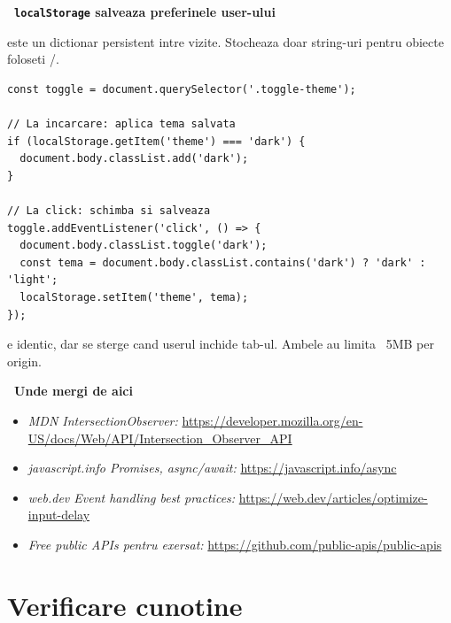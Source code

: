 \begin{bonusbox}
\textbf{\faSave\ \texttt{localStorage} \textendash{} salveaza preferinele user-ului}

 este un dictionar persistent intre vizite. Stocheaza doar string-uri \textendash{} pentru obiecte foloseti /.

\begin{lstlisting}[style=js, caption={Tema dark se p\u astreaz\u a intre vizite}]
const toggle = document.querySelector('.toggle-theme');

// La incarcare: aplica tema salvata
if (localStorage.getItem('theme') === 'dark') {
  document.body.classList.add('dark');
}

// La click: schimba si salveaza
toggle.addEventListener('click', () => {
  document.body.classList.toggle('dark');
  const tema = document.body.classList.contains('dark') ? 'dark' : 'light';
  localStorage.setItem('theme', tema);
});
\end{lstlisting}

 e identic, dar se sterge cand userul inchide tab-ul. Ambele au limita ~5MB per origin.

\medskip

\textbf{\faRoute\ Unde mergi de aici}

\begin{itemize}[itemsep=1pt]
  \item \emph{MDN IntersectionObserver:} \url{https://developer.mozilla.org/en-US/docs/Web/API/Intersection_Observer_API}
  \item \emph{javascript.info \textendash{} Promises, async/await:} \url{https://javascript.info/async}
  \item \emph{web.dev Event handling best practices:} \url{https://web.dev/articles/optimize-input-delay}
  \item \emph{Free public APIs pentru exersat:} \url{https://github.com/public-apis/public-apis}
\end{itemize}
\end{bonusbox}

\section*{Verificare cunotine}

